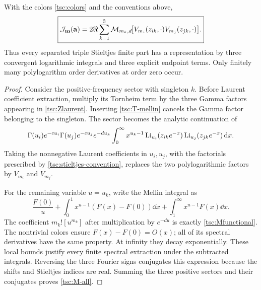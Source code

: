 \begin{theorem}\label{tsc:mellin-all}
With the colors \eqref{tsc:colors} and the conventions above,
\begin{equation}\label{tsc:M-all}
 \boxed{\displaystyle
 \mathcal J_{\mathbf m}(\mathbf a)=2\Re\sum_{k=1}^3
 \mathcal M_{m_k,d}\!\big[
       V_{m_i}(z_{ik},\cdot)V_{m_j}(z_{jk},\cdot)\big].}
\end{equation}
Thus every separated triple Stieltjes finite part has a representation by
three convergent logarithmic integrals and three explicit endpoint terms.
Only finitely many polylogarithm order derivatives at order zero occur.
\end{theorem}
\begin{proof}
Consider the positive-frequency sector with singleton $k$. Before Laurent
coefficient extraction, multiply its Tornheim term by the three Gamma
factors appearing in \eqref{tsc:Zlaurent}. Inserting
\eqref{tsc:T-mellin} cancels the Gamma factor belonging to the singleton.
The sector becomes the analytic continuation of
\begin{equation}\label{tsc:sector-mellin}
 \Gamma(u_i)e^{-cu_i}\Gamma(u_j)e^{-cu_j}e^{-du_k}
 \int_0^\infty x^{u_k-1}
           \operatorname{Li}_{u_i}(z_{ik}e^{-x})\operatorname{Li}_{u_j}(z_{jk}e^{-x})\,\mathrm d x.
\end{equation}
Taking the nonnegative Laurent coefficients in $u_i,u_j$, with the
factorials prescribed by \eqref{tsc:stieltjes-convention}, replaces the two
polylogarithmic factors by $V_{m_i}$ and $V_{m_j}$.

For the remaining variable $u=u_k$, write the Mellin integral as
\[
 \frac{F(0)}u+
 \int_0^1x^{u-1}(F(x)-F(0))\dd x+
 \int_1^\infty x^{u-1}F(x)\dd x.
\]
The coefficient $m_k![u^{m_k}]$ after multiplication by $e^{-du}$ is exactly
\eqref{tsc:Mfunctional}. The nontrivial colors ensure $F(x)-F(0)=O(x)$;
all of its spectral derivatives have the same property. At infinity they
decay exponentially. These local bounds justify every finite spectral
extraction under the subtracted integrals. Reversing the three Fourier
signs conjugates this expression because the shifts and Stieltjes indices
are real. Summing the three positive sectors and their conjugates proves
\eqref{tsc:M-all}.
\end{proof}


